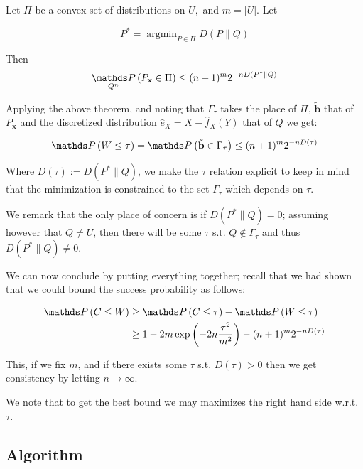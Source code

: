 \begin{theorem}\label{sanov}

    Let $\Pi$ be a convex set of distributions on $U,$ and $m=|U| .$ Let

    \[
        P^{*}=\operatorname{argmin}_{P \in \Pi} D(P \| Q)
    \]
    
    Then
    \[
        \underset{Q^{n}}{\Prob}\left(P_{\mathbf{x}} \in \Pi\right) \leq(n+1)^{m} 2^{-nD\left(P^{*} \| Q\right)}
    \]
    
\end{theorem}

Applying the above theorem, and noting that $\Gamma_\tau$ takes the place of $\Pi$, $\tilde{\mathbf{b}}$ that of $P_{\mathbf{x}}$
and the discretized distribution $\hat{e}_X = X - \hat{f}_X(Y)$ that of $Q$ we get:

\begin{equation}
    \Prob\left(W \leq \tau \right) = \Prob\left( \tilde{\mathbf{b}} \in \Gamma_\tau \right) 
    \leq (n+1)^{m} 2^{-nD\left( \tau \right)}
\end{equation}

Where $D\left( \tau \right) := D\left(P^{*} \| Q\right)$, we make the $\tau$ relation explicit to 
keep in mind that the minimization is constrained to the set $\Gamma_\tau$ which depends on $\tau$.

We remark that the only place of concern is if $D\left(P^{*} \| Q\right) = 0$; assuming however that $Q \neq U$, then 
there will be some $\tau$ s.t. $Q \notin \Gamma_\tau$ and thus $D\left(P^{*} \| Q\right) \neq 0$.

We can now conclude by putting everything together; recall that we had shown that we could bound the success probability 
as follows:



\begin{align}
    \Prob\left(C \leq W\right) &\geq \Prob\left(C \leq \tau \right) - \Prob\left(W \leq \tau \right) \\
    &\geq 1 - 2m\exp \left( -2n \frac{\tau^2}{m^2} \right) - (n+1)^{m} 2^{-nD\left( \tau \right)}
\end{align}

This, if we fix $m$, and if there exists some $\tau$ s.t. $D\left( \tau \right) > 0$ then we get consistency
by letting $n \rightarrow \infty$.

We note that to get the best bound we may maximizes the right hand side w.r.t. $\tau$.

\subsection{Algorithm}

